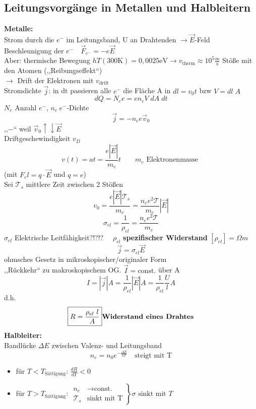 \documentclass[titlepage,12pt,a4paper,ngerman]{report}
\newcommand{\tx}[1]{\textrm{#1}}
\begin{document}
\subsection{Leitungsvorgänge in Metallen und Halbleitern}
\textbf{Metalle:} \\
Strom durch die $ e^- $ im Leitungsband, U an Drahtenden $ \rightarrow  \vec{E}$-Feld\\
Beschleunigung der $ e^- \quad \vec{F}_{e^-} = - e \vec{E}$\\
Aber: thermische Bewegung $hT(300\tx{K})= 0,0025 \tx{eV} \rightarrow v_{\tx{therm}} \approx 10^5 \frac{\tx{m}}{\tx{s}}$
Stöße mit den Atomen (,,Reibungseffekt``)\\
$\rightarrow$ Drift der Elektronen mit $ v_{\tx{drift}} $\\[5pt]
Stromdichte $ \vec{j} $: in dt passieren alle $ e^- $ die Fläche A in $dl = v_0 t$ bzw $ V = dl\;A $\\
$$dQ = N_e e = e n_e V \;dA\;dt$$ 
$N_e$ Anzahl $e^-$, $n_e \ e^- $-Dichte\\
$$\boxed{\vec{j} = - n_e e \vec{v}_0}$$ ,,$-$`` weil $ \vec{v}_0 \uparrow \downarrow \vec{E} $\\
Driftgeschewindigkeit $v_D$ 
$$v(t) = a t = \frac{e|\vec{E}|}{m_e} t \qquad m_e \tx{ Elektronenmasse }$$
(mit $ F_el = q \cdot \vec{E} $ und $ q = e $)\\
Sei $ \mathcal{T}_s $ mittlere Zeit zwischen 2 Stößen
$$v_0 = \frac{e|\vec{E}| \mathcal{T}_s}{m_e} = \boxed{\frac{n_e e^2 \mathcal{T}}{m_e}} |\vec{E}|$$
$$\boxed{\sigma_{el} = \frac{1}{\rho_{el}} = \frac{n_e e^2 \mathcal{T}}{m_e}}$$
$ \sigma_{el} $ Elektrische Leitfähigkeit?!?!? $\quad \rho_{el} $ \textbf{spezifischer Widerstand} $ [\rho_{el} ] = \Omega m $
$$\boxed{\vec{j} = \sigma_{el} \vec{E}}$$
ohmsches Gesetz in mikroskopischer/originaler Form\\
,,Rückkehr`` zu makroskopischem OG. $ \vec{I} = \tx{const.} $ über A
$$I = |\vec{j}| A = \frac{1}{\rho_{el}} |\vec{E}| A = \frac{1}{\rho_{el}} \frac{U}{l} A$$
d.h. $$\boxed{ R = \frac{\rho_{el}\ l}{A}} \tx{\textbf{Widerstand eines Drahtes}}$$
\textbf{Halbleiter:}\\
Bandlücke $ \Delta E $ zwischen Valenz- und Leitungsband 
$$n_e = n_0 e^{-\frac{\Delta E}{k T}} \quad \tx{steigt mit T}$$
\begin{itemize}
	\item für $ T<T_{\tx{Sättigung}} $: $ \frac{dR}{dT} <0$
	\item für $ T>T_{\tx{Sättigung}} $: $ \left. \begin{array}{ll}
	n_e & \rightarrow \tx{const.} \\ \mathcal{T}_s & \tx{sinkt mit T}
	\end{array} \right\}  
	\sigma \tx{ sinkt mit } T$
\end{itemize}
\end{document}

